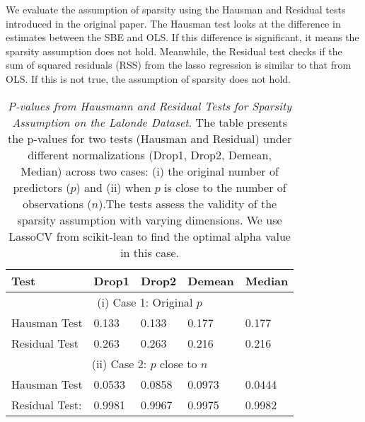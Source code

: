 We evaluate the assumption of sparsity using the Hausman and Residual tests introduced in the original paper. The Hausman test looks at the difference in estimates between the SBE and OLS. If this difference is significant, it means the sparsity assumption does not hold. Meanwhile, the Residual test checks if the sum of squared residuals (RSS) from the lasso regression is similar to that from OLS. If this is not true, the assumption of sparsity does not hold. \\

\begin{table}[h!]
\renewcommand{\arraystretch}{1.5}
\centering
\begin{tabular}{||l l l l l||} 
 \hline
 \hline
 Test & Drop1 & Drop2 &  Demean & Median \\ [0.5ex] 
 \hline \hline
 \multicolumn{5}{||c||}{(i) Case 1: Original $p$} \\ [0.5ex]
 Hausman Test & 0.133 & 0.133 & 0.177 & 0.177 \\ 
 Residual Test & 0.263 & 0.263 & 0.216 & 0.216 \\
 \hline
 \multicolumn{5}{||c||}{(ii) Case 2: $p$ close to $n$} \\ [0.5ex]
 Hausman Test & 0.0533 & 0.0858 & 0.0973 & 0.0444 \\ 
 Residual Test: & 0.9981 & 0.9967  & 0.9975 & 0.9982 \\ [1ex] 
 \hline \hline
\end{tabular}
\caption{\textit{P-values from Hausmann and Residual Tests for Sparsity Assumption on the Lalonde Dataset}. The table presents the p-values for two tests (Hausman and Residual) under different normalizations (Drop1, Drop2, Demean, Median) across two cases: (i) the original number of predictors ($p$) and (ii) when $p$ is close to the number of observations ($n$).The tests assess the validity of the sparsity assumption with varying dimensions. We use LassoCV from scikit-lean to find the optimal alpha value in this case. }


\label{table:1}
\end{table}

